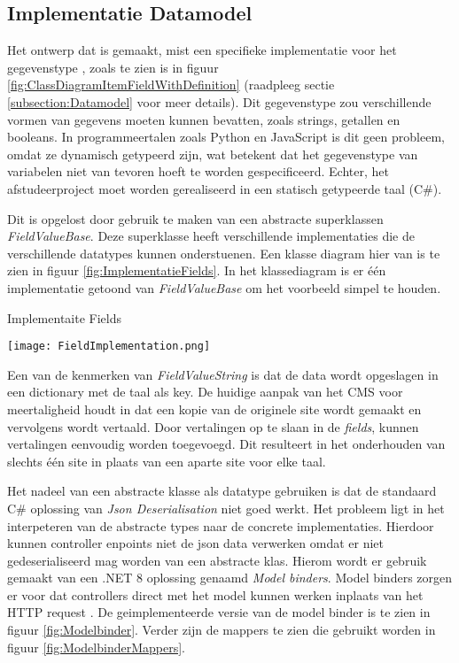 \subsection{Implementatie Datamodel}
Het ontwerp dat is gemaakt, mist een specifieke implementatie voor het gegevenstype , zoals te zien is in figuur \ref{fig:ClassDiagramItemFieldWithDefinition} (raadpleeg sectie \ref{subsection:Datamodel} voor meer details).
Dit gegevenstype zou verschillende vormen van gegevens moeten kunnen bevatten, zoals strings, getallen en booleans.
In programmeertalen zoals Python en JavaScript is dit geen probleem, omdat ze dynamisch getypeerd zijn, wat betekent dat het gegevenstype van variabelen niet van tevoren hoeft te worden gespecificeerd.
Echter, het afstudeerproject moet worden gerealiseerd in een statisch getypeerde taal (C\#).

\whitespace
Dit is opgelost door gebruik te maken van een abstracte superklassen \textit{FieldValueBase}.
Deze superklasse heeft verschillende implementaties die de verschillende datatypes kunnen onderstuenen.
Een klasse diagram hier van is te zien in figuur \ref{fig:ImplementatieFields}.
In het klassediagram is er één implementatie getoond van \textit{FieldValueBase} om het voorbeeld simpel te houden.

\whitespace
\begin{graphic}
    \captionsetup{type=figure}
    \caption{Implementaite Fields}
    \texttt{[image: FieldImplementation.png]}
    \label{fig:ImplementatieFields}
\end{graphic}

\whitespace
Een van de kenmerken van \textit{FieldValueString} is dat de data wordt opgeslagen in een dictionary met de taal als key.
De huidige aanpak van het CMS voor meertaligheid houdt in dat een kopie van de originele site wordt gemaakt en vervolgens wordt vertaald.
Door vertalingen op te slaan in de \textit{fields}, kunnen vertalingen eenvoudig worden toegevoegd.
Dit resulteert in het onderhouden van slechts één site in plaats van een aparte site voor elke taal.

\whitespace
Het nadeel van een abstracte klasse als datatype gebruiken is dat de standaard C\# oplossing van \textit{Json Deserialisation} niet goed werkt.
Het probleem ligt in het interpeteren van de abstracte types naar de concrete implementaties.
Hierdoor kunnen controller enpoints niet de json data verwerken omdat er niet gedeserialiseerd mag worden van een abstracte klas.
Hierom wordt er gebruik gemaakt van een .NET 8 oplossing genaamd \textit{Model binders}.
Model binders zorgen er voor dat controllers direct met het model kunnen werken inplaats van het HTTP request \parencite{ModelBinders}.
De geimplementeerde versie van de model binder is te zien in figuur \ref{fig:Modelbinder}.
Verder zijn de mappers te zien die gebruikt worden in figuur \ref{fig:ModelbinderMappers}.

